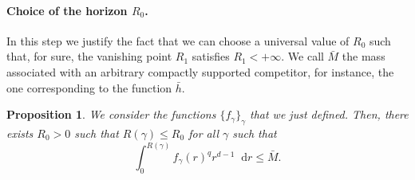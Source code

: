\documentclass[11pt,a4paper]{article}
\numberwithin{equation}{section}
\theoremstyle{plain}
\newtheorem{proposition}[theorem]{Proposition}
\theoremstyle{remark}
\newcommand{\diff}{\mathop{}\!\mathrm{d}}
\begin{document}
\paragraph{Choice of the horizon $R_0$.}

In this step we justify the fact that we can choose a universal value of $R_0$ such that, for sure, the vanishing point $R_1$ satisfies $R_1<+\infty$. We call $\bar M$ the mass associated with an arbitrary compactly supported competitor, for instance, the one corresponding to the function $\bar h$.
\begin{proposition}\label{prop:def_R0}
 We consider the functions $\{f_{\gamma}\}_{\gamma}$ that we just defined.
Then, there exists $R_0>0$ such that $R(\gamma)\leq R_0$ for all $\gamma$ such that
$$
\int_{0}^{R(\gamma)} f_{\gamma}(r)^{q}r^{d-1}\diff r \le \bar{M}. 
$$
\end{proposition}
\end{document}
